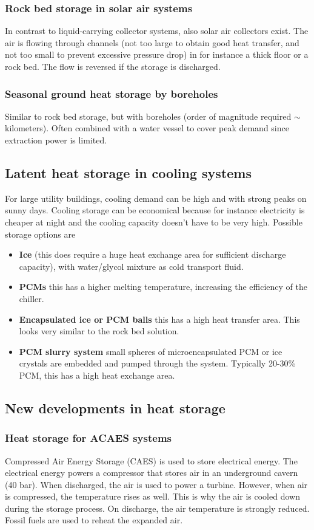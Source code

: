 \documentclass[a4paper,10pt]{article}
\begin{document}
\subsubsection{Rock bed storage in solar air systems}
In contrast to liquid-carrying collector systems, also solar air collectors exist. The air is flowing through channels (not too large to obtain good heat transfer, and not too small to prevent excessive pressure drop) in for instance a thick floor or a rock bed. The flow is reversed if the storage is discharged.

\subsubsection{Seasonal ground heat storage by boreholes}
Similar to rock bed storage, but with boreholes (order of magnitude required $\sim$ kilometers). Often combined with a water vessel to cover peak demand since extraction power is limited.

\subsection{Latent heat storage in cooling systems}
For large utility buildings, cooling demand can be high and with strong peaks on sunny days. Cooling storage can be economical because for instance electricity is cheaper at night and the cooling capacity doesn't have to be very high. Possible storage options are
\begin{itemize}
 \item \textbf{Ice} (this does require a huge heat exchange area for sufficient discharge capacity), with water/glycol mixture as cold transport fluid.
 \item \textbf{PCMs} this has a higher melting temperature, increasing the efficiency of the chiller.
 \item \textbf{Encapsulated ice or PCM balls} this has a high heat transfer area. This looks very similar to the rock bed solution.
 \item \textbf{PCM slurry system} small spheres of microencapsulated PCM or ice crystals are embedded and pumped through the system. Typically 20-30\% PCM, this has a high heat exchange area.
\end{itemize}

\subsection{New developments in heat storage}
\subsubsection{Heat storage for ACAES systems}
Compressed Air Energy Storage (CAES) is used to store electrical energy. The electrical energy powers a compressor that stores air in an underground cavern (40 bar). When discharged, the air is used to power a turbine. However, when air is compressed, the temperature rises as well. This is why the air is cooled down during the storage process. On discharge, the air temperature is strongly reduced. Fossil fuels are used to reheat the expanded air. \bigskip
\end{document}
